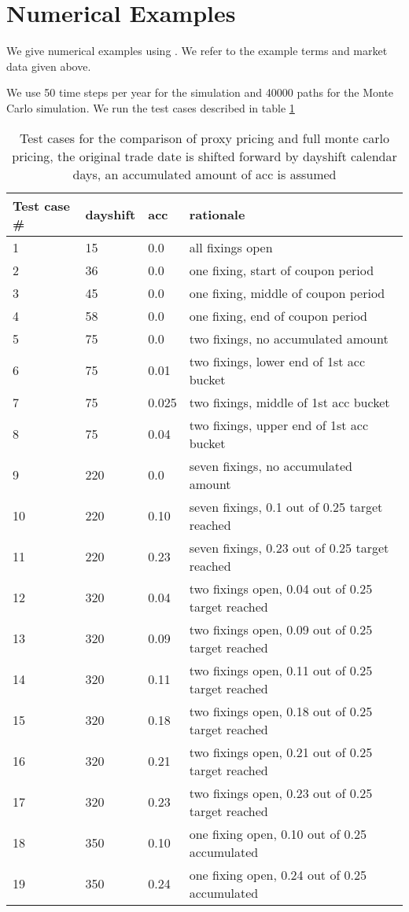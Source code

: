 \documentclass{amsart}
\theoremstyle{plain}
\numberwithin{equation}{section}
\begin{document}
\section{Numerical Examples}

We give numerical examples using \cite{ql}. We refer to the example terms and market data given above.

We use 50 time steps per year for the simulation and 40000 paths for the Monte Carlo simulation. We run the test cases described in table \ref{testcases}

\begin{table}[ht]
\caption{Test cases for the comparison of proxy pricing and full monte carlo pricing, the original trade date is shifted forward by dayshift calendar days, an accumulated amount of acc is assumed}
\begin{tabular}{l | l | l | l}
Test case \# & dayshift & acc & rationale \\ \hline
1 & 15 & 0.0 & all fixings open \\
2 & 36 & 0.0 & one fixing, start of coupon period \\
3 & 45 & 0.0 & one fixing, middle of coupon period \\
4 & 58 & 0.0 & one fixing, end of coupon period \\
5 & 75 & 0.0 & two fixings, no accumulated amount \\
6 & 75 & 0.01 & two fixings, lower end of 1st acc bucket \\
7 & 75 & 0.025 & two fixings, middle of 1st acc bucket \\
8 & 75 & 0.04 & two fixings, upper end of 1st acc bucket \\
9 & 220 & 0.0 & seven fixings, no accumulated amount \\
10 & 220 & 0.10 & seven fixings, 0.1 out of 0.25 target reached \\
11 & 220 & 0.23 & seven fixings, 0.23 out of 0.25 target reached \\
12 & 320 & 0.04 & two fixings open, 0.04 out of 0.25 target reached \\
13 & 320 & 0.09 & two fixings open, 0.09 out of 0.25 target reached \\
14 & 320 & 0.11 & two fixings open, 0.11 out of 0.25 target reached \\
15 & 320 & 0.18 & two fixings open, 0.18 out of 0.25 target reached \\
16 & 320 & 0.21 & two fixings open, 0.21 out of 0.25 target reached \\
17 & 320 & 0.23 & two fixings open, 0.23 out of 0.25 target reached \\
18 & 350 & 0.10 & one fixing open, 0.10 out of 0.25 accumulated \\
19 & 350 & 0.24 & one fixing open, 0.24 out of 0.25 accumulated
\end{tabular}
\label{testcases}
\end{table}
\end{document}
